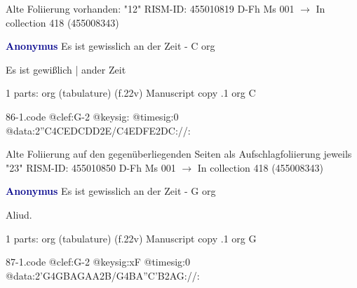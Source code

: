 \documentclass[twocolumn]{book}
\begin{document}
\newline Alte Foliierung vorhanden: "12"
\newline RISM-ID: 455010819
\newline D-Fh  Ms 001
\newline $\rightarrow$ In collection 418 (455008343)
      
\newline \par \vspace{7pt} \textcolor{darkblue}{\textbf{Anonymus  }}
\newline Es ist gewisslich an der Zeit - C
\newline org
\newline \begin{itshape}[f.22v, at left:] Es ist gewißlich | ander Zeit\end{itshape} 
\newline \textcolor{darkblue}{}  1 parts: org (tabulature)  (f.22v)
\newline Manuscript copy
.1  org  C  
\begin{filecontents*}{86-1.code}
@clef:G-2
@keysig:
@timesig:0
@data:2''C4CEDCDD2E/C4EDFE2DC://:
\end{filecontents*}
\newline
%

\newline Alte Foliierung auf den gegenüberliegenden Seiten als Aufschlagfoliierung jeweils "23"
\newline RISM-ID: 455010850
\newline D-Fh  Ms 001
\newline $\rightarrow$ In collection 418 (455008343)
      
\newline \par \vspace{7pt} \textcolor{darkblue}{\textbf{Anonymus  }}
\newline Es ist gewisslich an der Zeit - G
\newline org
\newline \begin{itshape}[f.22v, at left:] Aliud.\end{itshape} 
\newline \textcolor{darkblue}{}  1 parts: org (tabulature)  (f.22v)
\newline Manuscript copy
.1  org  G  
\begin{filecontents*}{87-1.code}
@clef:G-2
@keysig:xF
@timesig:0
@data:2'G4GBAGAA2B/G4BA''C'B2AG://:
\end{filecontents*}
\newline
%
\end{document}
